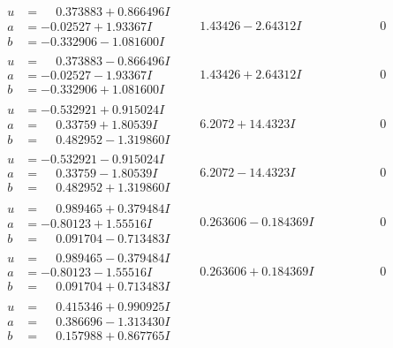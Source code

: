 \documentclass[1p]{elsarticle_modified}
\theoremstyle{definition}
\begin{document}
$$\begin{array}{c|c|c}
\begin{aligned}
u &= \phantom{-}0.373883 + 0.866496 I \\
a &= -0.02527 + 1.93367 I \\
b &= -0.332906 - 1.081600 I\end{aligned}
 & \phantom{-}1.43426 - 2.64312 I & \phantom{-0.000000 } 0 \\ \hline\begin{aligned}
u &= \phantom{-}0.373883 - 0.866496 I \\
a &= -0.02527 - 1.93367 I \\
b &= -0.332906 + 1.081600 I\end{aligned}
 & \phantom{-}1.43426 + 2.64312 I & \phantom{-0.000000 } 0 \\ \hline\begin{aligned}
u &= -0.532921 + 0.915024 I \\
a &= \phantom{-}0.33759 + 1.80539 I \\
b &= \phantom{-}0.482952 - 1.319860 I\end{aligned}
 & \phantom{-}6.2072 + 14.4323 I & \phantom{-0.000000 } 0 \\ \hline\begin{aligned}
u &= -0.532921 - 0.915024 I \\
a &= \phantom{-}0.33759 - 1.80539 I \\
b &= \phantom{-}0.482952 + 1.319860 I\end{aligned}
 & \phantom{-}6.2072 - 14.4323 I & \phantom{-0.000000 } 0 \\ \hline\begin{aligned}
u &= \phantom{-}0.989465 + 0.379484 I \\
a &= -0.80123 + 1.55516 I \\
b &= \phantom{-}0.091704 - 0.713483 I\end{aligned}
 & \phantom{-}0.263606 - 0.184369 I & \phantom{-0.000000 } 0 \\ \hline\begin{aligned}
u &= \phantom{-}0.989465 - 0.379484 I \\
a &= -0.80123 - 1.55516 I \\
b &= \phantom{-}0.091704 + 0.713483 I\end{aligned}
 & \phantom{-}0.263606 + 0.184369 I & \phantom{-0.000000 } 0 \\ \hline\begin{aligned}
u &= \phantom{-}0.415346 + 0.990925 I \\
a &= \phantom{-}0.386696 - 1.313430 I \\
b &= \phantom{-}0.157988 + 0.867765 I\end{aligned}

\end{array}$$
\end{document}
